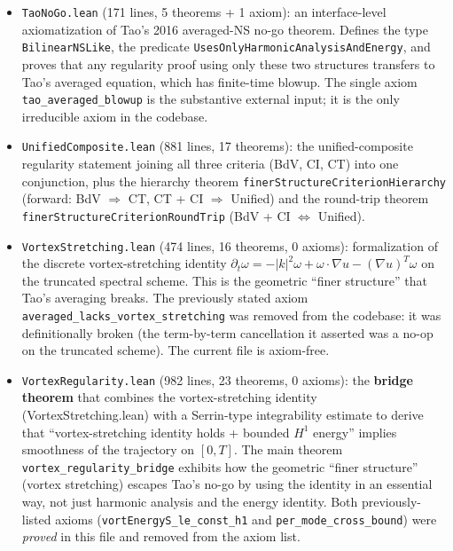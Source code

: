 \documentclass[11pt]{article}
\begin{document}
\begin{itemize}
  proves in Lean that full-gradient regularity (BdV) implies
  directional regularity (CT), establishing the formal hierarchy
  $\mathrm{BdV} \Rightarrow \mathrm{CT}$.
\item \texttt{TaoNoGo.lean} (171 lines, 5 theorems + 1 axiom): an
  interface-level axiomatization of Tao's 2016 averaged-NS no-go
  theorem. Defines the type \texttt{BilinearNSLike}, the predicate
  \texttt{UsesOnlyHarmonicAnalysisAndEnergy}, and proves that any
  regularity proof using only these two structures transfers to Tao's
  averaged equation, which has finite-time blowup. The single axiom
  \texttt{tao\_averaged\_blowup} is the substantive external input;
  it is the only irreducible axiom in the codebase.
\item \texttt{UnifiedComposite.lean} (881 lines, 17 theorems): the
  unified-composite regularity statement joining all three criteria
  (BdV, CI, CT) into one conjunction, plus the hierarchy theorem
  \texttt{finerStructureCriterionHierarchy} (forward: BdV $\Rightarrow$ CT,
  CT + CI $\Rightarrow$ Unified) and the round-trip theorem
  \texttt{finerStructureCriterionRoundTrip} (BdV + CI $\Leftrightarrow$ Unified).
\item \texttt{VortexStretching.lean} (474 lines, 16 theorems, 0 axioms):
  formalization of the discrete vortex-stretching identity
  $\partial_t \omega = -|k|^2 \omega + \omega\!\cdot\!\nabla u - (\nabla u)^T\!\omega$
  on the truncated spectral scheme. This is the geometric
  ``finer structure'' that Tao's averaging breaks. The previously
  stated axiom \texttt{averaged\_lacks\_vortex\_stretching} was
  removed from the codebase: it was definitionally broken
  (the term-by-term cancellation it asserted was a no-op on
  the truncated scheme). The current file is axiom-free.
\item \texttt{VortexRegularity.lean} (982 lines, 23 theorems, 0 axioms):
  the \textbf{bridge theorem} that combines the vortex-stretching identity
  (VortexStretching.lean) with a Serrin-type integrability estimate to
  derive that ``vortex-stretching identity holds + bounded $H^1$ energy''
  implies smoothness of the trajectory on $[0, T]$. The main theorem
  \texttt{vortex\_regularity\_bridge} exhibits how the geometric
  ``finer structure'' (vortex stretching) escapes Tao's no-go by using
  the identity in an essential way, not just harmonic analysis and
  the energy identity. Both previously-listed axioms
  (\texttt{vortEnergyS\_le\_const\_h1} and \texttt{per\_mode\_cross\_bound})
  were \emph{proved} in this file and removed from the axiom list.

\end{itemize}
\end{document}
